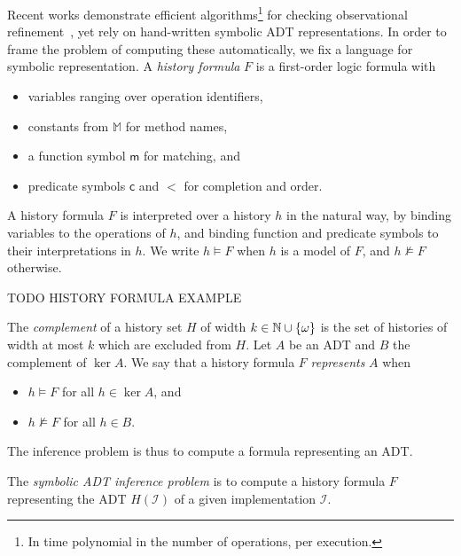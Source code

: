Recent works demonstrate efficient algorithms\footnote{In time polynomial in
the number of operations, per execution.} for checking observational
refinement~\cite{conf/popl/BouajjaniEEH15, conf/pldi/EmmiEH15}, yet rely on
hand-written symbolic ADT representations. In order to frame the problem of
computing these automatically, we fix a language for symbolic representation. A
\emph{history formula} $F$ is a first-order logic formula with
\begin{itemize}

  \item variables ranging over operation identifiers,

  \item constants from $\mathbb{M}$ for method names,

  \item a function symbol $\mathsf{m}$ for matching, and

  \item predicate symbols $\mathsf{c}$ and $\mathsf{<}$ for completion and
  order.

\end{itemize}
A history formula $F$ is interpreted over a history $h$ in the natural way, by
binding variables to the operations of $h$, and binding function and predicate
symbols to their interpretations in $h$. We write $h \models F$ when $h$ is a
model of $F$, and $h \not\models F$ otherwise.

\begin{example}

  TODO HISTORY FORMULA EXAMPLE

\end{example}

The \emph{complement} of a history set $H$ of width $k \in \mathbb{N} \cup
{\{{\omega}\}}$ is the set of histories of width at most $k$ which are excluded
from $H$. Let $A$ be an ADT and $B$ the complement of $\ker A$. We say that
a history formula $F$ \emph{represents} $A$ when
\begin{itemize}

  \item $h \models F$ for all $h \in \ker A$, and

  \item $h \not\models F$ for all $h \in B$.

\end{itemize}
The inference problem is thus to compute a formula representing an ADT.

\begin{definition}

  The \emph{symbolic ADT inference problem} is to compute a history formula $F$
  representing the ADT $H(\mathcal{I})$ of a given implementation $\mathcal{I}$.

\end{definition}
